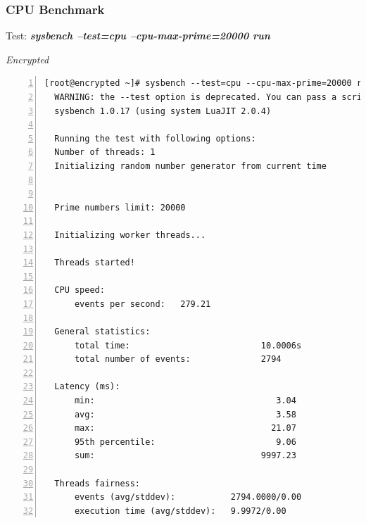 \subsubsection{CPU Benchmark}
\begin{center}
  Test: \textbf{\textit{sysbench --test=cpu --cpu-max-prime=20000 run}}  
\end{center}
\vspace*{-\baselineskip}
\noindent\begin{minipage}[t]{0.45\linewidth}
  \centering
  \textit{Encrypted}
  \begin{lstlisting}[basicstyle=\tiny,frame=single, numbers=left, label=cpu_test1]
  [root@encrypted ~]# sysbench --test=cpu --cpu-max-prime=20000 run
  WARNING: the --test option is deprecated. You can pass a script name or path on the command line without any options.
  sysbench 1.0.17 (using system LuaJIT 2.0.4)
  
  Running the test with following options:
  Number of threads: 1
  Initializing random number generator from current time
  
  
  Prime numbers limit: 20000
  
  Initializing worker threads...
  
  Threads started!
  
  CPU speed:
      events per second:   279.21
  
  General statistics:
      total time:                          10.0006s
      total number of events:              2794
  
  Latency (ms):
      min:                                    3.04
      avg:                                    3.58
      max:                                   21.07
      95th percentile:                        9.06
      sum:                                 9997.23
  
  Threads fairness:
      events (avg/stddev):           2794.0000/0.00
      execution time (avg/stddev):   9.9972/0.00
  \end{lstlisting}
\end{minipage}
\hspace{0.5cm}
